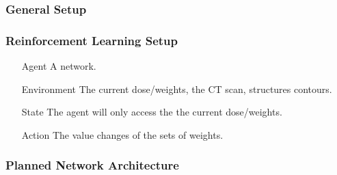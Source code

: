 \documentclass{beamer}
\begin{document}
	\subsubsection{General Setup}
	\begin{frame}
		\frametitle{Reinforcement Learning Setup}
		\begin{itemize}
			\item [Agent] A network.
			\item [Environment] The current dose/weights, the CT scan, structures contours.
			\item [State] The agent will only access the the current dose/weights.
			\item [Action] The value changes of the sets of weights.
			
			
		\end{itemize}
	\end{frame}
	\subsubsection{Planned Network Architecture}
\end{document}
